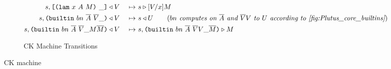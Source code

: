 \documentclass[../plutus-core-specification.tex]{subfiles}
\begin{document}
\begin{figure}[H]
\begin{subfigure}[c]{\linewidth}
\begin{alignat*}{2}
        s, \texttt{[} \texttt{(} \texttt{lam} ~ x ~ A ~ M \texttt{)} ~ \_ \texttt{]}& \triangleleft V& ~\mapsto~ &s \triangleright [V/x]M\\
        s, \texttt{(} \texttt{builtin} ~ bn ~ \overline{A} ~ \overline{V} \_  \texttt{)}& \triangleleft V& ~\mapsto~ &s \triangleleft U \qquad (\textit{$bn$ computes on $\overline{A}$ and $\overline{V}V$ to $U$ according to \ref{fig:Plutus_core_builtins}})\\
        s, \texttt{(} \texttt{builtin} ~ bn ~ \overline{A} ~ \overline{V} \_ M \overline{M} \texttt{)}& \triangleleft V& ~\mapsto~ &s, \texttt{(} \texttt{builtin} ~ bn ~ \overline{A} ~ \overline{V} V \_ \overline{M} \texttt{)} \triangleright M\\
    \end{alignat*}

    \caption{CK Machine Transitions}
    \label{fig:Plutus_core_ck_machine}
\end{subfigure}
\label{fig:ck-machine}
\caption{CK machine}
\end{figure}
\end{document}
